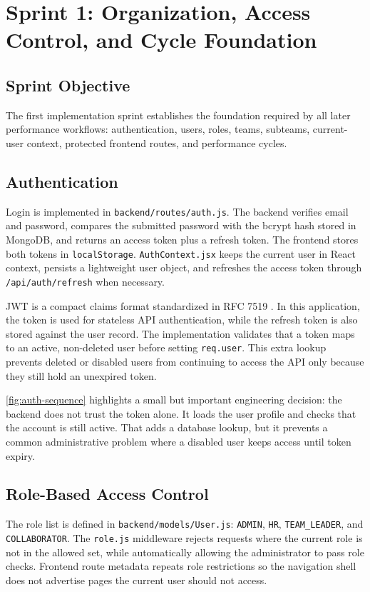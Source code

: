 \chapter{Sprint 1: Organization, Access Control, and Cycle Foundation}
\section{Sprint Objective}
The first implementation sprint establishes the foundation required by all later performance workflows: authentication, users, roles, teams, subteams, current-user context, protected frontend routes, and performance cycles.

\section{Authentication}
Login is implemented in \texttt{backend/routes/auth.js}. The backend verifies email and password, compares the submitted password with the bcrypt hash stored in MongoDB, and returns an access token plus a refresh token. The frontend stores both tokens in \texttt{localStorage}. \texttt{AuthContext.jsx} keeps the current user in React context, persists a lightweight user object, and refreshes the access token through \texttt{/api/auth/refresh} when necessary.

JWT is a compact claims format standardized in RFC 7519 \cite{rfc7519}. In this application, the token is used for stateless API authentication, while the refresh token is also stored against the user record. The implementation validates that a token maps to an active, non-deleted user before setting \texttt{req.user}. This extra lookup prevents deleted or disabled users from continuing to access the API only because they still hold an unexpired token.



\cref{fig:auth-sequence} highlights a small but important engineering decision: the backend does not trust the token alone. It loads the user profile and checks that the account is still active. That adds a database lookup, but it prevents a common administrative problem where a disabled user keeps access until token expiry.

\section{Role-Based Access Control}
The role list is defined in \texttt{backend/models/User.js}: \texttt{ADMIN}, \texttt{HR}, \texttt{TEAM\_LEADER}, and \texttt{COLLABORATOR}. The \texttt{role.js} middleware rejects requests where the current role is not in the allowed set, while automatically allowing the administrator to pass role checks. Frontend route metadata repeats role restrictions so the navigation shell does not advertise pages the current user should not access.

